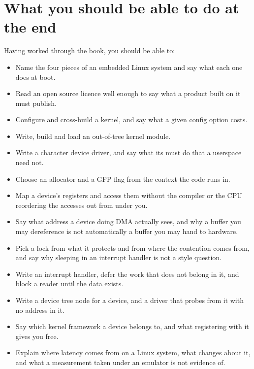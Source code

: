 \section*{What you should be able to do at the end}
Having worked through the book, you should be able to:
\begin{itemize}
  \item Name the four pieces of an embedded Linux system and say what each one does at boot.
  \item Read an open source licence well enough to say what a product built on it must publish.
  \item Configure and cross-build a kernel, and say what a given config option costs.
  \item Write, build and load an out-of-tree kernel module.
  \item Write a character device driver, and say what its  must do that a userspace
     need not.
  \item Choose an allocator and a GFP flag from the context the code runs in.
  \item Map a device's registers and access them without the compiler or the CPU reordering the
    accesses out from under you.
  \item Say what address a device doing DMA actually sees, and why a buffer you may dereference is
    not automatically a buffer you may hand to hardware.
  \item Pick a lock from what it protects and from where the contention comes from, and say why
    sleeping in an interrupt handler is not a style question.
  \item Write an interrupt handler, defer the work that does not belong in it, and block a reader
    until the data exists.
  \item Write a device tree node for a device, and a driver that probes from it with no address in
    it.
  \item Say which kernel framework a device belongs to, and what registering with it gives you
    free.
  \item Explain where latency comes from on a Linux system, what  changes about
    it, and what a measurement taken under an emulator is not evidence of.
\end{itemize}

